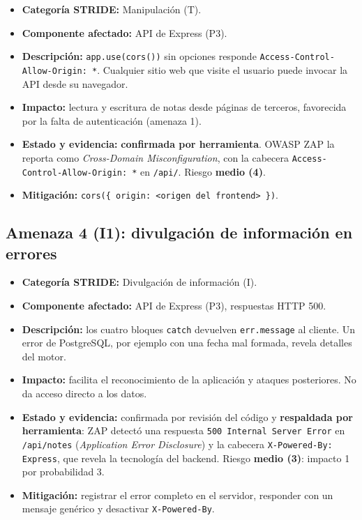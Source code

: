 \begin{itemize}
    \item \textbf{Categoría STRIDE:} Manipulación (T).
    \item \textbf{Componente afectado:} API de Express (P3).
    \item \textbf{Descripción:} \texttt{app.use(cors())} sin opciones
    responde \texttt{Access-Control-Allow-Origin: *}. Cualquier sitio web
    que visite el usuario puede invocar la API desde su navegador.
    \item \textbf{Impacto:} lectura y escritura de notas desde páginas de
    terceros, favorecida por la falta de autenticación (amenaza 1).
    \item \textbf{Estado y evidencia:} \textbf{confirmada por herramienta}.
    OWASP ZAP la reporta como \textit{Cross-Domain Misconfiguration}, con la
    cabecera \texttt{Access-Control-Allow-Origin: *} en \texttt{/api/}.
    Riesgo \textbf{medio (4)}.
    \item \textbf{Mitigación:} \texttt{cors(\{ origin: <origen del
    frontend> \})}.
\end{itemize}


\subsection{Amenaza 4 (I1): divulgación de información en errores}

\begin{itemize}
    \item \textbf{Categoría STRIDE:} Divulgación de información (I).
    \item \textbf{Componente afectado:} API de Express (P3), respuestas
    HTTP 500.
    \item \textbf{Descripción:} los cuatro bloques \texttt{catch} devuelven
    \texttt{err.message} al cliente. Un error de PostgreSQL, por ejemplo con
    una fecha mal formada, revela detalles del motor.
    \item \textbf{Impacto:} facilita el reconocimiento de la aplicación y
    ataques posteriores. No da acceso directo a los datos.
    \item \textbf{Estado y evidencia:} confirmada por revisión del código y
    \textbf{respaldada por herramienta}: ZAP detectó una respuesta
    \texttt{500 Internal Server Error} en \texttt{/api/notes}
    (\textit{Application Error Disclosure}) y la cabecera
    \texttt{X-Powered-By: Express}, que revela la tecnología del backend.
    Riesgo \textbf{medio (3)}: impacto 1 por probabilidad 3.
    \item \textbf{Mitigación:} registrar el error completo en el servidor,
    responder con un mensaje genérico y desactivar \texttt{X-Powered-By}.
\end{itemize}

